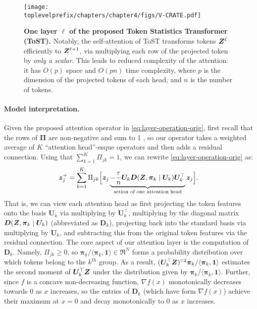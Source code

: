 \documentclass[../../book-main.tex]{subfiles}
\begin{document}
\begin{figure}[t]
    \centering \texttt{[image: \\toplevelprefix/chapters/chapter4/figs/V-CRATE.pdf]}
    \vspace{-1mm}
    \caption{\small \textbf{One layer $\ell$ of the proposed Token Statistics Transformer (ToST).} Notably, the self-attention of ToST transforms tokens $\bm{Z}^{\ell}$ efficiently to $\bm{Z}^{\ell+1}$, via multiplying each row of the projected token by \textit{only a scalar}. This leads to reduced complexity of the attention: it has $O(p)$ space and $O(pn)$ time complexity, where $p$ is the dimension of the projected tokens of each head, and $n$ is the number of tokens.
    }
    \label{fig:vcrate-architecture}
\end{figure}

\paragraph{Model interpretation.} Given the proposed attention operator in \eqref{eq:layer-operation-orig}, first recall that the rows of $\bm\Pi$ are non-negative and sum to 1
, so our operator takes a weighted average of $K$ ``attention head''-esque operators and then adds a residual connection. Using that \(\sum_{k = 1}^{K}\Pi_{jk} = 1\), we can rewrite \eqref{eq:layer-operation-orig} as: %
\vspace{-2mm}
\begin{equation}
\label{eq:z_up}
    \bm{z}_j^+ = \sum_{k=1}^K \Pi_{jk} \Big[ \bm{z}_j \underbrace{- \frac{\tau}{n} \bm U_{k} \bm D(\bm{Z}, \bm \pi_{k} \mid \bm U_{k}) \bm U_{k}^{\top}}_{\text{action of one attention head}} \bm{z}_j \Big].
\end{equation}
That is, we can view each attention head as first projecting the token features
onto the basis $\bm U_{k}$ via multiplying by $\bm U_k^\top$, multiplying by the
diagonal matrix $\bm D(\bm{Z}, \bm \pi_{k} \mid \bm U_{k})$ (abbreviated as \(\bm
D_{k}\)), projecting back into the standard basis via multiplying by $\bm
U_{k}$, and subtracting this from the original token features via the residual
connection. The core aspect of our attention layer is the computation of $\bm
D_{k}$.  Namely, \(\Pi_{jk} \geq 0\), so $\bm \pi_k / \langle \bm \pi_{k}, \bm
1\rangle \in \Re^N$ forms a probability distribution over which tokens belong to
the $k^\text{th}$ group.  As a result, $(\bm U^\top_k \Z)^{\hada 2} \bm \pi_k / \langle \bm \pi_{k}, \bm 1\rangle$ estimates the second moment of $\bm U_k^\top \bm{Z}$ under the distribution given by $\bm \pi_k /  \langle \bm \pi_{k}, \bm 1\rangle$.  Further, since $f$ is a concave non-decreasing function, $\nabla f(x)$ monotonically decreases towards $0$ as $x$ increases, so the entries of $\bm D_{k}$ (which have form $\nabla f(x)$) achieve their maximum at $x=0$ %
and decay monotonically to $0$ as $x$ increases.
\end{document}
